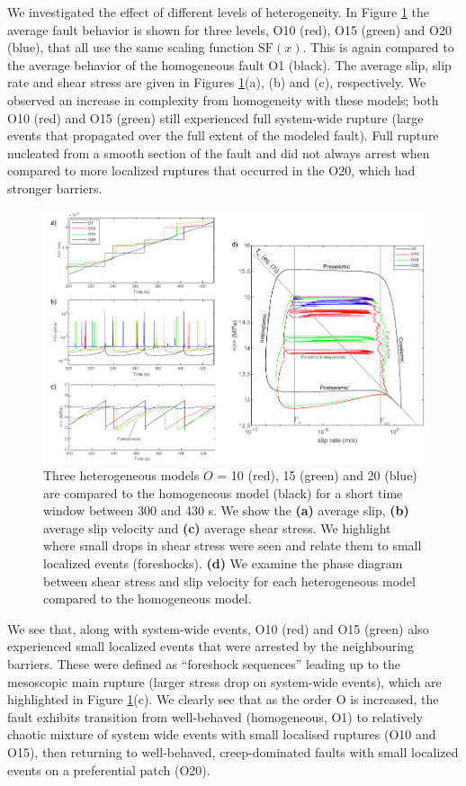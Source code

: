 \documentclass[preprint,1p, 10pt,authoryear]{elsarticle}
\begin{document}
We investigated the effect of different levels of heterogeneity. In Figure \ref{fig7} the average fault behavior is shown for three levels, O10 (red), O15 (green) and O20 (blue), that all use the same scaling function $\mathrm{SF}(x)$.  This is again compared to the average behavior of the homogeneous fault O1 (black).  The average slip, slip rate and shear stress are given in Figures \ref{fig7}(a), (b) and (c), respectively.  We observed an increase in complexity from homogeneity with these models; both O10 (red) and O15 (green) still experienced full system-wide rupture (large events that propagated over the full extent of the modeled fault).  Full rupture nucleated from a smooth section of the fault and did not always arrest when compared to more localized ruptures that occurred in the O20, which had stronger barriers. 

\begin{figure}
	\centering
	\includegraphics{FIG7.pdf} 
	\caption{Three heterogeneous models $O$ =  10 (red), 15 (green) and 20 (blue) are compared to the homogeneous model (black) for a short time window between 300 and 430 s. We show the \textbf{(a)} average slip, \textbf{(b)} average slip velocity and \textbf{(c)} average shear stress.  We highlight where small drops in shear stress were seen and relate them to small localized events (foreshocks). \textbf{(d)} We examine the phase diagram between shear stress and slip velocity for each heterogeneous model compared to the homogeneous model.}
	\label{fig7}
\end{figure} 

We see that, along with system-wide events, O10 (red) and O15 (green) also experienced small localized events that were arrested by the neighbouring barriers. These were defined as ``foreshock sequences'' leading up to the mesoscopic main rupture (larger stress drop on system-wide events), which are highlighted in Figure \ref{fig7}(c). We clearly see that as the order O is increased, the fault exhibits transition from well-behaved (homogeneous, O1) to relatively chaotic mixture of system wide events with small localised ruptures (O10 and O15), then returning to well-behaved, creep-dominated faults with small localized events on a preferential patch (O20).
\end{document}

